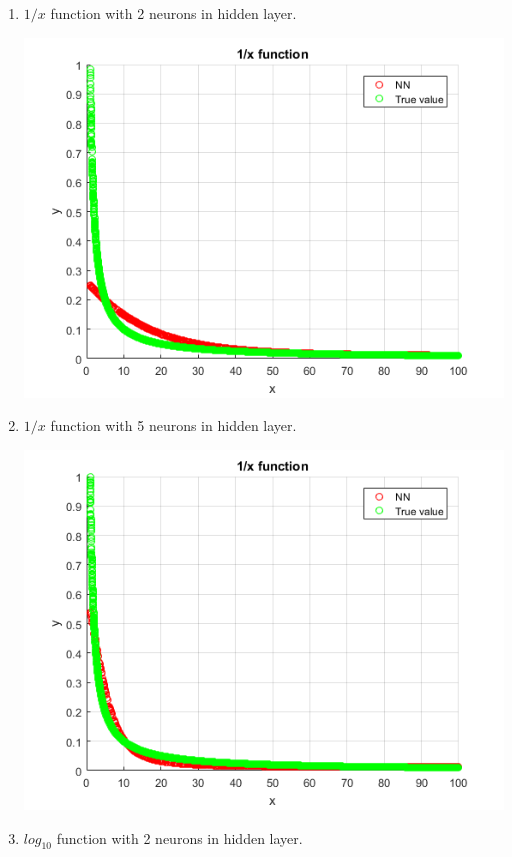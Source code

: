 \documentclass[a4paper, 12pt]{article}
\begin{document}
\begin{enumerate}
\item $1/x$ function with 2 neurons in hidden layer. 

\includegraphics[scale = 0.8]{hyp2.png}

\item $1/x$ function with 5 neurons in hidden layer.

\includegraphics[scale = 0.8]{hyp5.png}

\item $log_{10}$ function with 2 neurons in hidden layer.


\end{enumerate}
\end{document}
